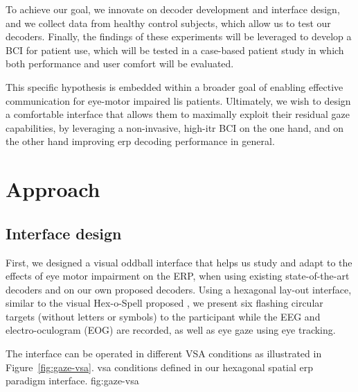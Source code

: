 To achieve our goal, we innovate on decoder development and interface design,
and we collect data from healthy control subjects, which allow us to test our decoders.
Finally, the findings of these experiments will be leveraged to develop a BCI
for patient use, which will be tested in a case-based patient study in which
both performance and user comfort will be evaluated.

This specific hypothesis is embedded within a broader goal of enabling
effective communication for eye-motor impaired \ac{lis} patients.
Ultimately, we wish to design a comfortable interface that allows them to maximally exploit
their residual gaze capabilities, by leveraging a non-invasive, high-\ac{itr}
BCI on the one hand, and on the other hand improving \ac{erp} decoding performance
in general.

\section{Approach}

\subsection{Interface design}


First, we designed a visual oddball interface that helps us study and adapt
to the effects of eye motor impairment on the ERP, when using existing state-of-the-art
decoders and on our own proposed decoders.
Using a hexagonal lay-out interface, similar to the visual Hex-o-Spell proposed
\textcite{Treder2010}, we present six flashing circular targets
(without letters or symbols) to the participant while the EEG and
electro-oculogram (EOG) are recorded, as well as eye gaze using eye tracking.

The interface can be operated in different VSA conditions as illustrated in
Figure~\ref{fig:gaze-vsa}.
\fourpanefig
  {}
  {}
  {}
  {}
  {\Ac{vsa} conditions defined in our hexagonal spatial \ac{erp} paradigm interface.}
  {fig:gaze-vsa}

